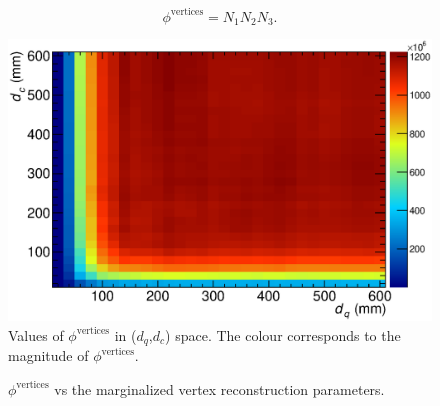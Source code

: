 \begin{equation}
  \phi^{\textrm{vertices}} = N_1N_2N_3.
\end{equation}
\begin{figure}
  \centering
  \includegraphics[width=12cm]{images/selection/vertex_recon/FOM_2D}
  \caption{Values of $\phi^{\textrm{vertices}}$ in ($d_q$,$d_c$) space.  The colour corresponds to the magnitude of $\phi^{\textrm{vertices}}$.}
  \label{fig:VertexReconFOM}
\end{figure}
\begin{figure}
  \centering
  \caption{$\phi^{\textrm{vertices}}$ vs the marginalized vertex reconstruction parameters.}
  \label{fig:VertexReconMarginalizedDistributions}
\end{figure}
